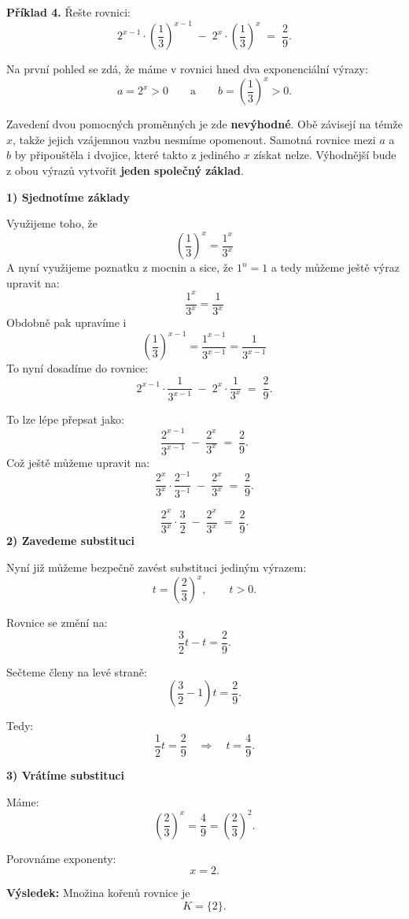 \documentclass[12pt,a4paper]{article}
\begin{document}
\begin{examplebox}
\textbf{Příklad 4.}  
Řešte rovnici:
\[
    2^{x-1} \cdot \left(\frac{1}{3}\right)^{x-1}
    \;-\;
    2^x \cdot \left(\frac{1}{3}\right)^x
    \;=\;
    \frac{2}{9}.
\]

Na první pohled se zdá, že máme v rovnici hned dva exponenciální výrazy:
\[
a = 2^x>0
\qquad\text{a}\qquad
b = \left(\frac{1}{3}\right)^x>0.
\]

Zavedení dvou pomocných proměnných je zde \textbf{nevýhodné}.
Obě závisejí na témže $x$, takže jejich vzájemnou vazbu nesmíme opomenout.
Samotná rovnice mezi $a$ a $b$ by připouštěla i dvojice, které takto z jediného $x$ získat nelze.
Výhodnější bude z obou výrazů vytvořit \textbf{jeden společný základ}.

\medskip
\textbf{1) Sjednotíme základy}

Využijeme toho, že
\[
    \left(\frac{1}{3}\right)^x = \frac{1^x}{3^x}
\]
A nyní využijeme poznatku z mocnin a sice, že $1^n = 1 $ a tedy můžeme ještě výraz upravit na:
\[
    \frac{1^x}{3^x} = \frac{1}{3^x}
\]
Obdobně pak upravíme i
\[
    \left(\frac{1}{3}\right)^{x-1} = \frac{1^{x-1}}{3^{x-1}} = \frac{1}{3^{x-1}}
\]
To nyní dosadíme do rovnice:
\[
    2^{x-1} \cdot \frac{1}{3^{x-1}}
    \;-\;
    2^x \cdot \frac{1}{3^x}
    \;=\;
    \frac{2}{9}.
\]

To lze lépe přepsat jako:
\[
    \frac{2^{x-1}}{3^{x-1}}
    \;-\;
    \frac{2^x}{3^x}
    \;=\;
    \frac{2}{9}.
\]
Což ještě můžeme upravit na: 
\[
    \frac{2^{x}}{3^{x}} \cdot \frac{2^{-1}}{3^{-1}}
    \;-\;
    \frac{2^x}{3^x}
    \;=\;
    \frac{2}{9}.
\]

\[
    \frac{2^{x}}{3^{x}} \cdot \frac{3}{2}
    \;-\;
    \frac{2^x}{3^x}
    \;=\;
    \frac{2}{9}.
\]
\medskip
\textbf{2) Zavedeme substituci}

Nyní již můžeme bezpečně zavést substituci jediným výrazem:
\[
    t = \left(\frac{2}{3}\right)^x, \qquad t>0.
\]

Rovnice se změní na:
\[
    \frac{3}{2} t - t = \frac{2}{9}.
\]

Sečteme členy na levé straně:
\[
    \left(\frac{3}{2} - 1\right)t = \frac{2}{9}.
\]

Tedy:
\[
    \frac{1}{2}t = \frac{2}{9}
    \quad\Longrightarrow\quad
    t = \frac{4}{9}.
\]

\medskip
\textbf{3) Vrátíme substituci}

Máme:
\[
    \left(\frac{2}{3}\right)^x = \frac{4}{9}
    = \left(\frac{2}{3}\right)^2.
\]

Porovnáme exponenty:
\[
    x = 2.
\]

\medskip
\textbf{Výsledek:}  
Množina kořenů rovnice je
\[
K = \{2\}.
\]
\end{examplebox}
\end{document}
